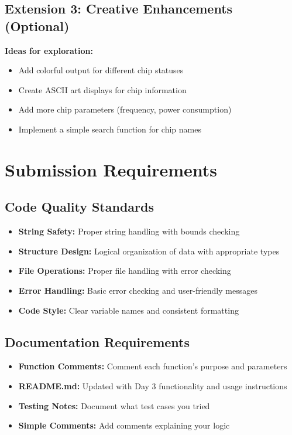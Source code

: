 \documentclass[11pt,a4paper]{article}
\begin{document}
\subsection{Extension 3: Creative Enhancements (Optional)}

\textbf{Ideas for exploration:}
\begin{itemize}
    \item Add colorful output for different chip statuses
    \item Create ASCII art displays for chip information
    \item Add more chip parameters (frequency, power consumption)
    \item Implement a simple search function for chip names
\end{itemize}

\section{Submission Requirements}

\subsection{Code Quality Standards}
\begin{itemize}
    \item \textbf{String Safety:} Proper string handling with bounds checking
    \item \textbf{Structure Design:} Logical organization of data with appropriate types
    \item \textbf{File Operations:} Proper file handling with error checking
    \item \textbf{Error Handling:} Basic error checking and user-friendly messages
    \item \textbf{Code Style:} Clear variable names and consistent formatting
\end{itemize}

\subsection{Documentation Requirements}
\begin{itemize}
    \item \textbf{Function Comments:} Comment each function's purpose and parameters
    \item \textbf{README.md:} Updated with Day 3 functionality and usage instructions
    \item \textbf{Testing Notes:} Document what test cases you tried
    \item \textbf{Simple Comments:} Add comments explaining your logic
\end{itemize}
\end{document}
